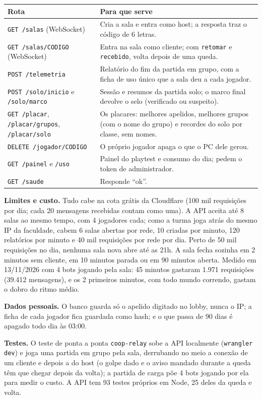 \documentclass[11pt,a4paper]{article}
\begin{document}
\begin{xltabular}{\textwidth}{@{}lX@{}}
\toprule
\textbf{Rota} & \textbf{Para que serve} \\
\midrule
\texttt{GET /salas} (WebSocket) & Cria a sala e entra como host; a resposta traz o código de 6 letras. \\
\texttt{GET /salas/CODIGO} (WebSocket) & Entra na sala como cliente; com \texttt{retomar} e \texttt{recebido}, volta depois de uma queda. \\
\texttt{POST /telemetria} & Relatório do fim da partida em grupo, com a ficha de uso único que a sala deu a cada jogador. \\
\texttt{POST /solo/inicio} e \texttt{/solo/marco} & Sessão e resumos da partida solo; o marco final devolve o selo (verificado ou suspeito). \\
\texttt{GET /placar}, \texttt{/placar/grupos}, \texttt{/placar/solo} & Os placares: melhores apelidos, melhores grupos (com o nome do grupo) e recordes do solo por classe, sem nomes. \\
\texttt{DELETE /jogador/CODIGO} & O próprio jogador apaga o que o PC dele gerou. \\
\texttt{GET /painel} e \texttt{/uso} & Painel do playtest e consumo do dia; pedem o token de administrador. \\
\texttt{GET /saude} & Responde ``ok''. \\
\bottomrule
\end{xltabular}

\textbf{Limites e custo.} Tudo cabe na cota grátis da Cloudflare (100 mil requisições por dia; cada 20 mensagens recebidas contam como uma). A API aceita até 8 salas ao mesmo tempo, com 4 jogadores cada; como a turma joga atrás do mesmo IP da faculdade, cabem 6 salas abertas por rede, 10 criadas por minuto, 120 relatórios por minuto e 40 mil requisições por rede por dia. Perto de 50 mil requisições no dia, nenhuma sala nova abre até as 21h. A sala fecha sozinha em 2 minutos sem cliente, em 10 minutos parada ou em 90 minutos aberta. Medido em 13/11/2026 com 4 bots jogando pela sala: 45 minutos gastaram 1.971 requisições (39.412 mensagens), e os 2 primeiros minutos, com todo mundo correndo, gastam o dobro do ritmo médio.

\textbf{Dados pessoais.} O banco guarda só o apelido digitado no lobby, nunca o IP; a ficha de cada jogador fica guardada como hash; e o que passa de 90 dias é apagado todo dia às 03:00.

\textbf{Testes.} O teste de ponta a ponta \texttt{coop-relay} sobe a API localmente (\texttt{wrangler dev}) e joga uma partida em grupo pela sala, derrubando no meio a conexão de um cliente e depois a do host (o golpe dado e o aviso mandado durante a queda têm que chegar depois da volta); a partida de carga põe 4 bots jogando por ela para medir o custo. A API tem 93 testes próprios em Node, 25 deles da queda e volta.
\end{document}
